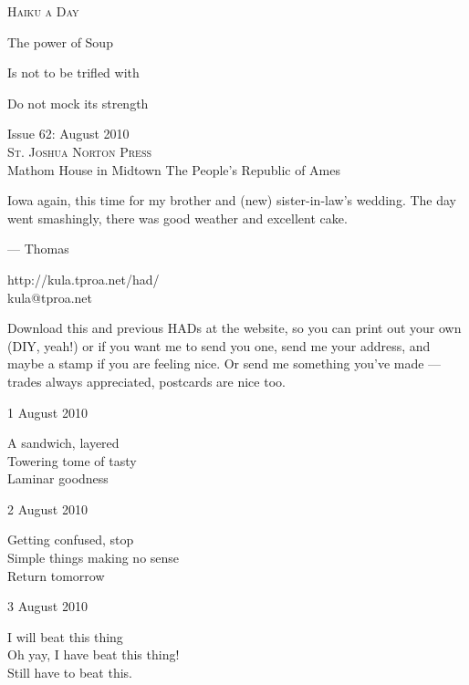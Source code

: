 \documentclass[12pt]{article}
\begin{document}
\begin{center}
{\fontsize{36}{48}\selectfont \textsc{Haiku a Day }}
\end{center}

\vspace*{3.5cm}

{\fontsize{20}{40}\selectfont 

The power of Soup 

Is not to be trifled with

Do not mock its strength


}

\vspace*{5.0cm}
\begin{center}
{\large{Issue 62: August 2010}} \\[5mm]
{\fontsize{8}{8}\selectfont  \textsc{ St. Joshua Norton Press }} \\[1mm]
{\fontsize{6}{6}\selectfont Mathom House in Midtown \textbar The People's Republic of Ames }
\end{center}


\newpage

Iowa again, this time for my brother and (new) sister-in-law's wedding.
The day went smashingly, there was good weather and excellent cake. 

--- Thomas

http://kula.tproa.net/had/ \\
kula@tproa.net

Download this and previous HADs at the website, so you can
print out your own (DIY, yeah!) or if you want me to send
you one, send me your address, and maybe a stamp if you
are feeling nice. Or send me something you've made ---
trades always appreciated, postcards are nice too.

\vspace*{2.5cm}

1 August 2010

A sandwich, layered \\
Towering tome of tasty \\
Laminar goodness

2 August 2010

Getting confused, stop \\
Simple things making no sense \\
Return tomorrow

3 August 2010

I will beat this thing \\
Oh yay, I have beat this thing! \\
Still have to beat this.
\end{document}
